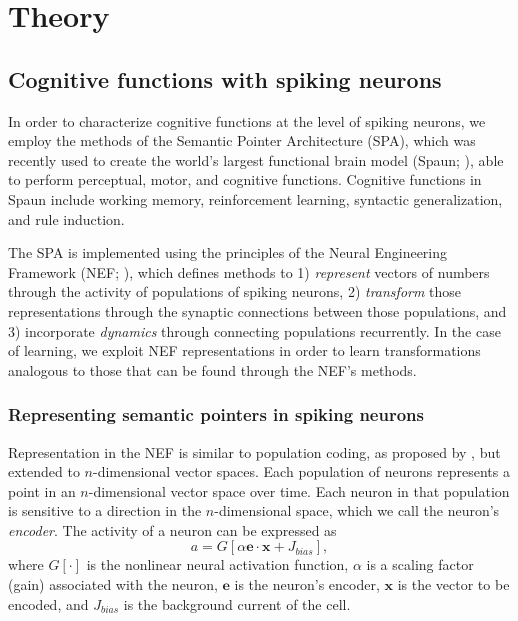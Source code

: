 \documentclass[10pt,letterpaper]{article}
\begin{document}
\section{Theory}

\subsection{Cognitive functions with spiking neurons}

In order to characterize cognitive functions
at the level of spiking neurons,
we employ the methods of the Semantic Pointer Architecture (SPA),
which was recently used to create the world's largest
functional brain model (Spaun; ),
able to perform perceptual, motor, and cognitive functions.
Cognitive functions in Spaun include working memory,
reinforcement learning, syntactic generalization,
and rule induction.

The SPA is implemented using the principles of
the Neural Engineering Framework (NEF; ),
which defines methods to
1) \textit{represent} vectors of numbers
through the activity of populations of spiking neurons,
2) \textit{transform} those representations through
the synaptic connections between those populations, and
3) incorporate \textit{dynamics} through
connecting populations recurrently.
In the case of learning,
we exploit NEF representations in order to
learn transformations analogous
to those that can be found through the NEF's methods.

\subsubsection{Representing semantic pointers in spiking neurons}

Representation in the NEF is
similar to population coding, as proposed by
,
but extended to $n$-dimensional vector spaces.
Each population of neurons represents
a point in an $n$-dimensional vector space over time.
Each neuron in that population is sensitive to
a direction in the $n$-dimensional space,
which we call the neuron's \textit{encoder}.
The activity of a neuron can be expressed as
\begin{equation}
  a = G[\alpha \mathbf{e} \cdot \mathbf{x} + J_{bias}],
\end{equation}
where $G[\cdot]$ is the nonlinear neural activation function,
$\alpha$ is a scaling factor (gain) associated with the neuron,
$\mathbf{e}$ is the neuron's encoder,
$\mathbf{x}$ is the vector to be encoded, and
$J_{bias}$ is the background current of the cell.
\end{document}
